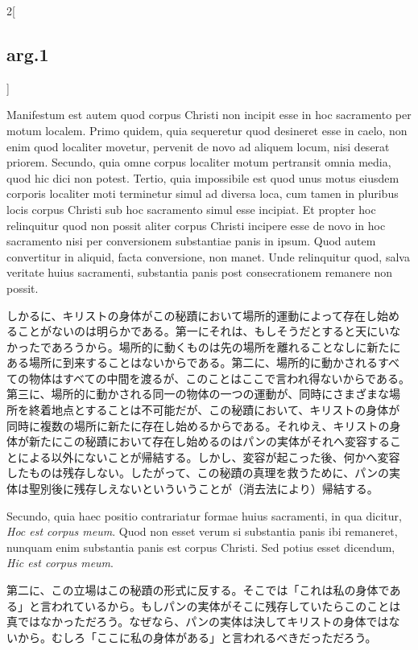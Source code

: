 \documentclass[paper=a4paper,fontsize=10pt,jafontsize=9pt,titlepage]{jlreq}
\begin{document}
\begin{paracol}{2}[\subsection{arg.1}]
\switchcolumn*

Manifestum est autem quod corpus Christi non incipit esse in hoc
sacramento per motum localem. Primo quidem, quia sequeretur quod
desineret esse in caelo, non enim quod localiter movetur, pervenit de
novo ad aliquem locum, nisi deserat priorem. Secundo, quia omne corpus
localiter motum pertransit omnia media, quod hic dici non
potest. Tertio, quia impossibile est quod unus motus eiusdem corporis
localiter moti terminetur simul ad diversa loca, cum tamen in pluribus
locis corpus Christi sub hoc sacramento simul esse incipiat. Et
propter hoc relinquitur quod non possit aliter corpus Christi incipere
esse de novo in hoc sacramento nisi per conversionem substantiae panis
in ipsum. Quod autem convertitur in aliquid, facta conversione, non
manet. Unde relinquitur quod, salva veritate huius sacramenti,
substantia panis post consecrationem remanere non possit.

\switchcolumn

しかるに、キリストの身体がこの秘蹟において場所的運動によって存在し始め
ることがないのは明らかである。第一にそれは、もしそうだとすると天にいな
かったであろうから。場所的に動くものは先の場所を離れることなしに新たに
ある場所に到来することはないからである。第二に、場所的に動かされるすべ
ての物体はすべての中間を渡るが、このことはここで言われ得ないからである。
第三に、場所的に動かされる同一の物体の一つの運動が、同時にさまざまな場
所を終着地点とすることは不可能だが、この秘蹟において、キリストの身体が
同時に複数の場所に新たに存在し始めるからである。それゆえ、キリストの身
体が新たにこの秘蹟において存在し始めるのはパンの実体がそれへ変容するこ
とによる以外にないことが帰結する。しかし、変容が起こった後、何かへ変容
したものは残存しない。したがって、この秘蹟の真理を救うために、パンの実
体は聖別後に残存しえないといういうことが（消去法により）帰結する。

\switchcolumn*

Secundo, quia haec positio contrariatur formae huius sacramenti, in
qua dicitur, {\itshape Hoc est corpus meum}. Quod non esset verum si
substantia panis ibi remaneret, nunquam enim substantia panis est
corpus Christi. Sed potius esset dicendum, {\itshape Hic est corpus
meum}.

\switchcolumn

第二に、この立場はこの秘蹟の形式に反する。そこでは「これは私の身体であ
る」と言われているから。もしパンの実体がそこに残存していたらこのことは
真ではなかっただろう。なぜなら、パンの実体は決してキリストの身体ではな
いから。むしろ「ここに私の身体がある」と言われるべきだっただろう。


\end{paracol}
\end{document}
